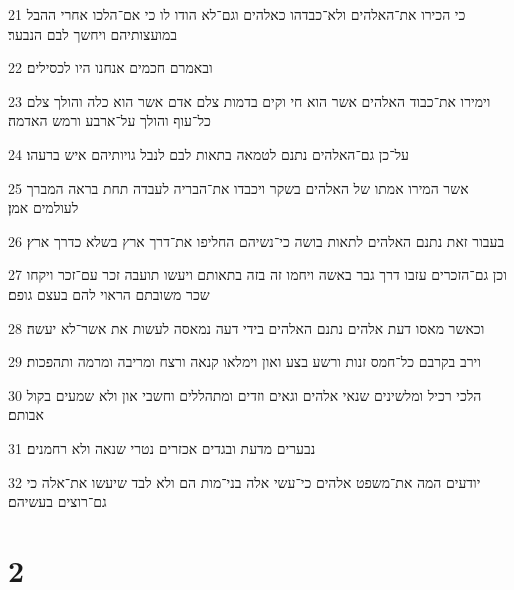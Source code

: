 \par 21 כי הכירו את־האלהים ולא־כבדהו כאלהים וגם־לא הודו לו כי אם־הלכו אחרי ההבל במועצותיהם ויחשך לבם הנבער׃
\par 22 ובאמרם חכמים אנחנו היו לכסילים׃
\par 23 וימירו את־כבוד האלהים אשר הוא חי וקים בדמות צלם אדם אשר הוא כלה והולך צלם כל־עוף והולך על־ארבע ורמש האדמה׃
\par 24 על־כן גם־האלהים נתנם לטמאה בתאות לבם לנבל גויותיהם איש ברעהו׃
\par 25 אשר המירו אמתו של האלהים בשקר ויכבדו את־הבריה לעבדה תחת בראה המברך לעולמים אמן׃
\par 26 בעבור זאת נתנם האלהים לתאות בושה כי־נשיהם החליפו את־דרך ארץ בשלא כדרך ארץ׃
\par 27 וכן גם־הזכרים עזבו דרך גבר באשה ויחמו זה בזה בתאותם ויעשו תועבה זכר עם־זכר ויקחו שכר משובתם הראוי להם בעצם גופם׃
\par 28 וכאשר מאסו דעת אלהים נתנם האלהים בידי דעה נמאסה לעשות את אשר־לא יעשה׃
\par 29 וירב בקרבם כל־חמס זנות ורשע בצע ואון וימלאו קנאה ורצח ומריבה ומרמה ותהפכות׃
\par 30 הלכי רכיל ומלשינים שנאי אלהים וגאים וזדים ומתהללים וחשבי און ולא שמעים בקול אבותם׃
\par 31 נבערים מדעת ובגדים אכזרים נטרי שנאה ולא רחמנים׃
\par 32 יודעים המה את־משפט אלהים כי־עשי אלה בני־מות הם ולא לבד שיעשו את־אלה כי גם־רוצים בעשיהם׃

\chapter{2}

